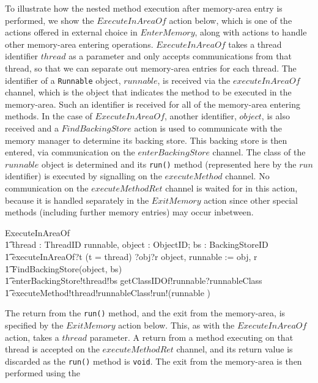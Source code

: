 To illustrate how the nested method execution after memory-area entry
is performed, we show the $ExecuteInAreaOf$ action below, which is one
of the actions offered in external choice in $EnterMemory$, along with
actions to handle other memory-area entering operations.
$ExecuteInAreaOf$ takes a thread identifier $thread$ as a parameter
and only accepts communications from that thread, so that we can
separate out memory-area entries for each thread.
The identifier of a \texttt{Runnable} object, $runnable$, is received
via the $executeInAreaOf$ channel, which is the object that indicates
the method to be executed in the memory-area. 
Such an identifier is received for all of the memory-area entering
methods.
In the case of $ExecuteInAreaOf$, another identifier, $object$, is
also received and a $FindBackingStore$ action is used to communicate
with the memory manager to determine its backing store.
This backing store is then entered, via communication on the
$enterBackingStore$ channel.
The class of the $runnable$ object is determined and its
\texttt{run()} method (represented here by the $run$ identifier) is
executed by signalling on the $executeMethod$ channel.
No communication on the $executeMethodRet$ channel is waited for in
this action, because it is handled separately in the $ExitMemory$
action since other special methods (including further memory entries)
may occur inbetween.
\begin{circusaction}
  ExecuteInAreaOf \circdef \\
  \t1 \circval thread : ThreadID \circspot \circvar runnable, object : ObjectID; bs : BackingStoreID \circspot \\
  \t1 executeInAreaOf?t \prefixcolon (t = thread) ?obj?r \then object, runnable := obj, r \circseq \\
  \t1 FindBackingStore(object, bs) \circseq \\
  \t1 enterBackingStore!thread!bs \then getClassIDOf!runnable?runnableClass \\
  \t1 {} \then executeMethod!thread!runnableClass!run!(\langle runnable \rangle) \then \Skip
\end{circusaction}
The return from the \texttt{run()} method, and the exit from the
memory-area, is specified by the $ExitMemory$ action below.
This, as with the $ExecuteInAreaOf$ action, takes a $thread$
parameter.
A return from a method executing on that thread is accepted on the
$executeMethodRet$ channel, and its return value is discarded as the
\texttt{run()} method is \texttt{void}.
The exit from the memory-area is then performed using the
